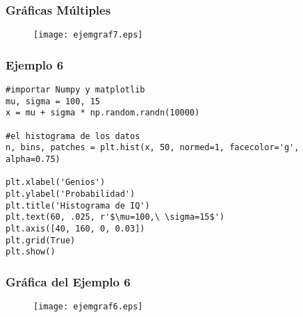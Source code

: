 \documentclass[12pt]{beamer}
\begin{document}
\begin{frame}[fragile]
\frametitle{Gr\'{a}ficas M\'{u}ltiples}
\begin{figure}
	\centering	
	\texttt{[image: ejemgraf7.eps]} 
\end{figure}
\end{frame}
\begin{frame}[fragile]
\frametitle{Ejemplo 6}
\begin{minipage}{0.9\textwidth}
\begin{lstlisting}
#importar Numpy y matplotlib
mu, sigma = 100, 15
x = mu + sigma * np.random.randn(10000)

#el histograma de los datos
n, bins, patches = plt.hist(x, 50, normed=1, facecolor='g', alpha=0.75)

plt.xlabel('Genios')
plt.ylabel('Probabilidad')
plt.title('Histograma de IQ')
plt.text(60, .025, r'$\mu=100,\ \sigma=15$')
plt.axis([40, 160, 0, 0.03])
plt.grid(True)
plt.show()
\end{lstlisting}
\end{minipage}
\end{frame}
\begin{frame}[fragile]
\frametitle{Gr\'{a}fica del Ejemplo 6}
\begin{figure}
	\centering	
	\texttt{[image: ejemgraf6.eps]} 
\end{figure}
\end{frame}
\end{document}
